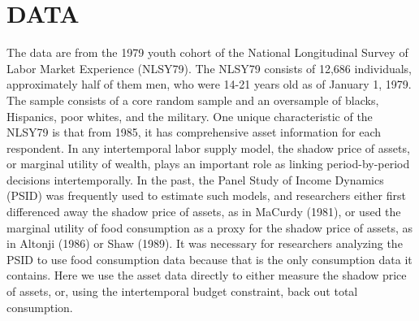 \documentclass{article}
\begin{document}
\section{DATA}
\label{section:data}
The data are from the 1979 youth cohort of the National Longitudinal Survey of Labor Market Experience (NLSY79). The NLSY79 consists of 12,686 individuals, approximately half of them men, who were 14-21 years old as of January 1, 1979. The sample consists of a core random sample and an oversample of blacks, Hispanics, poor whites, and the military. One unique characteristic of the NLSY79 is that from 1985, it has comprehensive asset information for each respondent. In any intertemporal labor supply model, the shadow price of assets, or marginal utility of wealth, plays an important role as linking period-by-period decisions intertemporally. In the past, the Panel Study of Income Dynamics (PSID) was frequently used to estimate such models, and researchers either first differenced away the shadow price of assets, as in MaCurdy (1981), or used the marginal utility of food consumption as a proxy for the shadow price of assets, as in Altonji (1986) or Shaw (1989). It was necessary for researchers analyzing the PSID to use food consumption data because that is the only consumption data it contains. Here we use the asset data directly to either measure the shadow price of assets, or, using the intertemporal budget constraint, back out total consumption. \par
\end{document}
